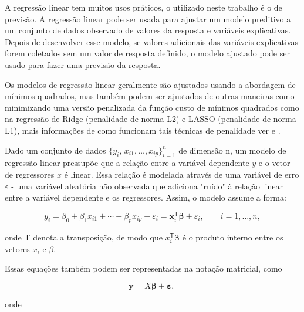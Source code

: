 A regressão linear tem muitos usos práticos, o utilizado neste trabalho é o de previsão. A regressão linear pode ser usada para ajustar um modelo preditivo a um conjunto de dados observado de valores da resposta e variáveis ​​explicativas. Depois de desenvolver esse modelo, se valores adicionais das variáveis ​​explicativas forem coletados sem um valor de resposta definido, o modelo ajustado pode ser usado para fazer uma previsão da resposta.

Os modelos de regressão linear geralmente são ajustados usando a abordagem de mínimos quadrados, mas também podem ser ajustados de outras maneiras como minimizando uma versão penalizada da função custo de mínimos quadrados como na regressão de Ridge (penalidade de norma L2) e LASSO (penalidade de norma L1), mais informações de como funcionam tais técnicas de penalidade ver \citet{SantosaAndSymes1986} e \citet{Tibshirani1996}.

Dado um conjunto de dados $ {\displaystyle \{y_{i},\,x_{i1},\ldots ,x_{ip}\}_{i=1}^{n}} $ de dimensão n, um modelo de regressão linear pressupõe que a relação entre a variável dependente $ y $ e o vetor de regressores $ x $ é linear. Essa relação é modelada através de uma variável de erro $ \varepsilon $ - uma variável aleatória não observada que adiciona "ruído" à relação linear entre a variável dependente e os regressores. Assim, o modelo assume a forma:

\begin{equation}
{\displaystyle y_{i}=\beta _{0}+\beta _{1}x_{i1}+\cdots +\beta _{p}x_{ip}+\varepsilon _{i}=\mathbf {x} _{i}^{\mathsf {T}}{\boldsymbol {\beta }}+\varepsilon _{i},\qquad i=1,\ldots ,n,}
\end{equation}

onde T denota a transposição, de modo que $ {x}_{i}^{\mathsf {T}}{\boldsymbol {\beta }} $ é o produto interno entre os vetores $ {x}_{i} $ e $ \beta $.

Essas equações também podem ser representadas na notação matricial, como

\begin{equation}
{\displaystyle \mathbf {y} =X{\boldsymbol {\beta }}+{\boldsymbol {\varepsilon }},\,}
\end{equation}

onde

